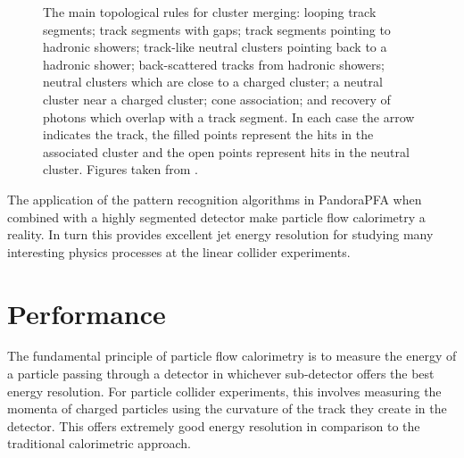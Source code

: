 \begin{figure}[h!]
\caption[The main topological rules for cluster merging: \protect{} looping track segments; \protect{} track segments with gaps; \protect{} track segments pointing to hadronic showers; \protect{} track-like neutral clusters pointing back to a hadronic shower; \protect{} back-scattered tracks from hadronic showers; \protect{} neutral clusters which are close to a charged cluster; \protect{} a neutral cluster near a charged cluster; \protect{} cone association; and \protect{} recovery of photons which overlap with a track segment.  In each case the arrow indicates the track, the filled points represent the hits in the associated cluster and the open points represent hits in the neutral cluster.  Figures taken from \cite{arXiv:0907.3577}.]{The main topological rules for cluster merging: \protect{} looping track segments; \protect{} track segments with gaps; \protect{} track segments pointing to hadronic showers; \protect{} track-like neutral clusters pointing back to a hadronic shower; \protect{} back-scattered tracks from hadronic showers; \protect{} neutral clusters which are close to a charged cluster; \protect{} a neutral cluster near a charged cluster; \protect{} cone association; and \protect{} recovery of photons which overlap with a track segment.  In each case the arrow indicates the track, the filled points represent the hits in the associated cluster and the open points represent hits in the neutral cluster.  Figures taken from \cite{arXiv:0907.3577}.}
\label{fig:associations}
\end{figure} 

The application of the pattern recognition algorithms in PandoraPFA when combined with a highly segmented detector make particle flow calorimetry a reality.  In turn this provides excellent jet energy resolution for studying many interesting physics processes at the linear collider experiments.


\section{Performance}
\label{sec:performance}
The fundamental principle of particle flow calorimetry is to measure the energy of a particle passing through a detector in whichever sub-detector offers the best energy resolution.  For particle collider experiments, this involves measuring the momenta of charged particles using the curvature of the track they create in the detector.  This offers extremely good energy resolution in comparison to the traditional calorimetric approach.  

